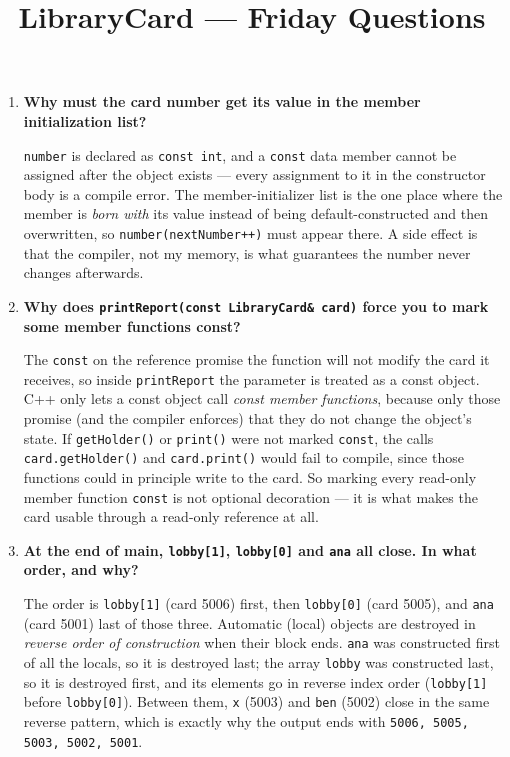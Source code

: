 \documentclass[11pt]{article}
\title{LibraryCard --- Friday Questions}
\author{}
\date{}
\begin{document}
\maketitle

\begin{enumerate}[leftmargin=2em, itemsep=1em]

\item \textbf{Why must the card number get its value in the member
initialization list?}

\texttt{number} is declared as \texttt{const int}, and a \texttt{const} data
member cannot be assigned after the object exists --- every assignment to it
in the constructor body is a compile error. The member-initializer list is the
one place where the member is \emph{born with} its value instead of being
default-constructed and then overwritten, so \texttt{number(nextNumber++)}
must appear there. A side effect is that the compiler, not my memory, is what
guarantees the number never changes afterwards.

\item \textbf{Why does \texttt{printReport(const LibraryCard\& card)} force you
to mark some member functions const?}

The \texttt{const} on the reference promise the function will not modify the
card it receives, so inside \texttt{printReport} the parameter is treated as a
const object. C++ only lets a const object call \emph{const member functions},
because only those promise (and the compiler enforces) that they do not change
the object's state. If \texttt{getHolder()} or \texttt{print()} were not
marked \texttt{const}, the calls \texttt{card.getHolder()} and
\texttt{card.print()} would fail to compile, since those functions could in
principle write to the card. So marking every read-only member function
\texttt{const} is not optional decoration --- it is what makes the card usable
through a read-only reference at all.

\item \textbf{At the end of main, \texttt{lobby[1]}, \texttt{lobby[0]} and
\texttt{ana} all close. In what order, and why?}

The order is \texttt{lobby[1]} (card 5006) first, then \texttt{lobby[0]}
(card 5005), and \texttt{ana} (card 5001) last of those three. Automatic
(local) objects are destroyed in \emph{reverse order of construction} when
their block ends. \texttt{ana} was constructed first of all the locals, so it
is destroyed last; the array \texttt{lobby} was constructed last, so it is
destroyed first, and its elements go in reverse index order
(\texttt{lobby[1]} before \texttt{lobby[0]}). Between them, \texttt{x} (5003)
and \texttt{ben} (5002) close in the same reverse pattern, which is exactly
why the output ends with \texttt{5006, 5005, 5003, 5002, 5001}.


\end{enumerate}
\end{document}

